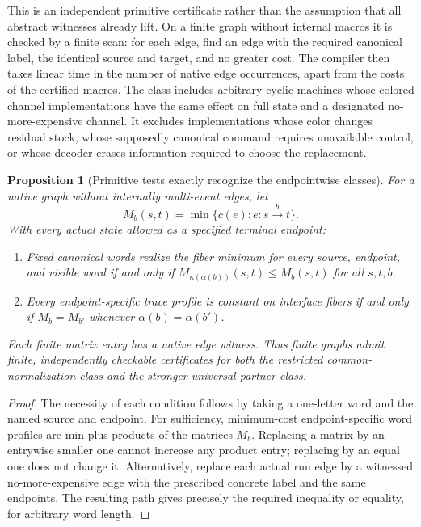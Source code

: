 \documentclass[11pt]{article}
\newtheorem{proposition}[theorem]{Proposition}
\begin{document}
This is an independent primitive certificate rather than the assumption that all abstract witnesses already lift. On a finite graph without internal macros it is checked by a finite scan: for each edge, find an edge with the required canonical label, the identical source and target, and no greater cost. The compiler then takes linear time in the number of native edge occurrences, apart from the costs of the certified macros. The class includes arbitrary cyclic machines whose colored channel implementations have the same effect on full state and a designated no-more-expensive channel. It excludes implementations whose color changes residual stock, whose supposedly canonical command requires unavailable control, or whose decoder erases information required to choose the replacement.

\begin{proposition}[Primitive tests exactly recognize the endpointwise classes]\label{prop:matrix-test}
For a native graph without internally multi-event edges, let
\[
 M_b(s,t)=\min\{c(e):e:s\xrightarrow{b}t\}.
\]
With every actual state allowed as a specified terminal endpoint:
\begin{enumerate}
\item Fixed canonical words realize the fiber minimum for every source, endpoint, and visible word if and only if
$M_{\kappa(\alpha(b))}(s,t)\leq M_b(s,t)$ for all $s,t,b$.
\item Every endpoint-specific trace profile is constant on interface fibers if and only if $M_b=M_{b'}$ whenever $\alpha(b)=\alpha(b')$.
\end{enumerate}
Each finite matrix entry has a native edge witness. Thus finite graphs admit finite, independently checkable certificates for both the restricted common-normalization class and the stronger universal-partner class.
\end{proposition}
\begin{proof}
The necessity of each condition follows by taking a one-letter word and the named source and endpoint. For sufficiency, minimum-cost endpoint-specific word profiles are min-plus products of the matrices $M_b$. Replacing a matrix by an entrywise smaller one cannot increase any product entry; replacing by an equal one does not change it. Alternatively, replace each actual run edge by a witnessed no-more-expensive edge with the prescribed concrete label and the same endpoints. The resulting path gives precisely the required inequality or equality, for arbitrary word length.
\end{proof}
\end{document}
